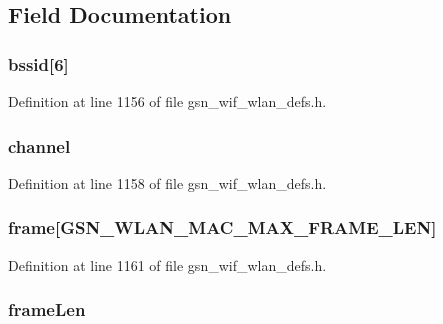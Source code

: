 \subsection{Field Documentation}
\hypertarget{a00400_af1eb240ad4299a104d0bf3fddcabbb95}{
\subsubsection[{bssid}]{ {\bf bssid}\mbox{[}6\mbox{]}}}
\label{a00400_af1eb240ad4299a104d0bf3fddcabbb95}


Definition at line 1156 of file gsn\_\-wif\_\-wlan\_\-defs.h.

\hypertarget{a00400_a52d69a3bd7bdfdfc6f9e40f4962c575d}{
\subsubsection[{channel}]{ {\bf channel}}}
\label{a00400_a52d69a3bd7bdfdfc6f9e40f4962c575d}


Definition at line 1158 of file gsn\_\-wif\_\-wlan\_\-defs.h.

\hypertarget{a00400_a06d2b4d6364cb0449f64790ee601c187}{
\subsubsection[{frame}]{ {\bf frame}\mbox{[}GSN\_\-WLAN\_\-MAC\_\-MAX\_\-FRAME\_\-LEN\mbox{]}}}
\label{a00400_a06d2b4d6364cb0449f64790ee601c187}


Definition at line 1161 of file gsn\_\-wif\_\-wlan\_\-defs.h.

\hypertarget{a00400_ad7d37183f86bdd7a3c11db21c3301b32}{
\subsubsection[{frameLen}]{ {\bf frameLen}}}
\label{a00400_ad7d37183f86bdd7a3c11db21c3301b32}


